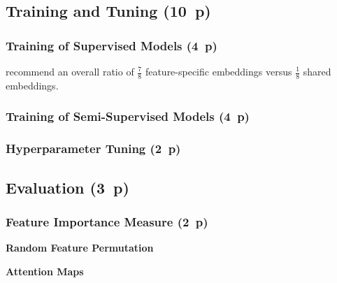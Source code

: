 \subsection{Training and Tuning (10~p)}\label{sec:training-and-tuning}

\subsubsection{Training of Supervised
    Models (4~p)}\label{sec:training-of-supervised-models}

\textcite[][12]{huangTabTransformerTabularData2020} recommend an overall ratio of $\tfrac{7}{8}$ feature-specific embeddings versus $\tfrac{1}{8}$ shared embeddings.

\subsubsection{Training of Semi-Supervised
    Models (4~p)}\label{sec:training-of-semi-supervised-models}


\subsubsection{Hyperparameter Tuning (2~p)}\label{sec:hyperparameter-tuning}


\subsection{Evaluation (3~p)}\label{sec:evaluation}

\subsubsection{Feature Importance
    Measure (2~p)}\label{sec:feature-importance-measure}

\textbf{Random Feature Permutation}


\textbf{Attention Maps}

